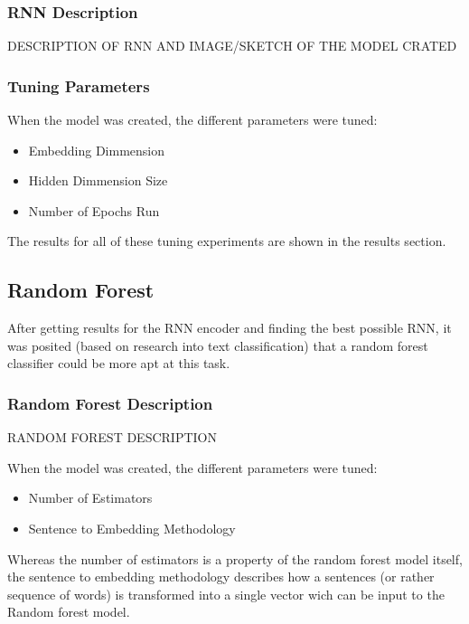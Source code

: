 \documentclass[twoside,twocolumn]{article}
\begin{document}
\subsubsection{RNN Description}

DESCRIPTION OF RNN AND IMAGE/SKETCH OF THE MODEL CRATED

\subsubsection{Tuning Parameters}

When the model was created, the different parameters were tuned:
\begin{itemize}
  \item{Embedding Dimmension}
  \item{Hidden Dimmension Size}
  \item{Number of Epochs Run}
\end{itemize}

The results for all of these tuning experiments are shown in the results section.


\subsection{Random Forest}

After getting results for the RNN encoder and finding the best possible RNN,
it was posited (based on research into text classification) that a random
forest classifier could be more apt at this task.

\subsubsection{Random Forest Description}

RANDOM FOREST DESCRIPTION

When the model was created, the different parameters were tuned:

\begin{itemize}
  \item{Number of Estimators}
  \item{Sentence to Embedding Methodology} 
\end{itemize}

Whereas the number of estimators is a property of the random forest model itself,
the sentence to embedding methodology describes how a sentences (or rather sequence of words)
is transformed into a single vector wich can be input to the Random forest model.
\end{document}
